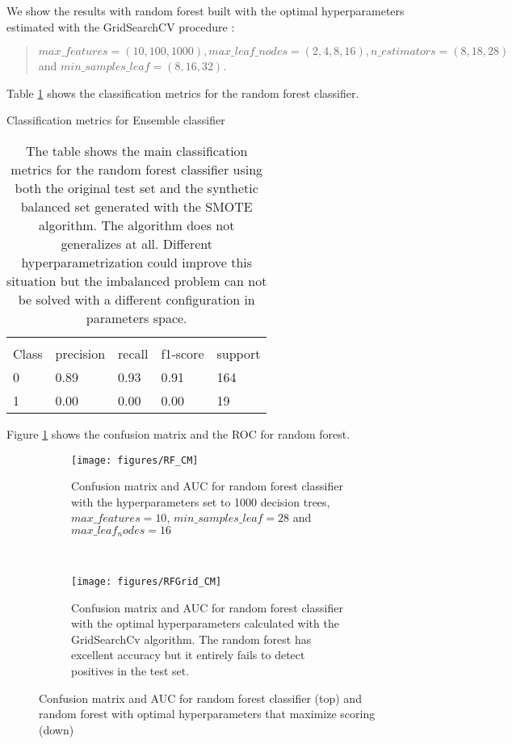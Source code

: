 \documentclass[11pt]{article}
\theoremstyle{definition}
\theoremstyle{remark}
\begin{document}
We show the results with random forest built with the optimal hyperparameters estimated with the GridSearchCV procedure
: 
\begin{quote}
$max\_features=(10,100,1000), max\_leaf\_nodes=(2,4,8,16), n\_estimators=(8,18,28)$ and  $min\_samples\_leaf=(8,16,32)$.
\end{quote}

Table \ref{tab:rf} shows the classification metrics for the random forest classifier.
\begin{table}[H]
\caption{Classification metrics for Ensemble classifier}
\begin{center} 
\begin{tabular}{lllll}
\hline
\multicolumn{1}{c}{} \\
Class & precision & recall & f1-score & support     \\
\hline
0 & 0.89  &    0.93   &   0.91   &    164 \\
1 & 0.00  &    0.00   &   0.00   &    19\\
\hline
\end{tabular}
\caption{The table shows the main classification metrics for the random forest classifier using both the original test set and the synthetic balanced set generated with the SMOTE algorithm. The algorithm does not generalizes at all. Different hyperparametrization could improve this situation but the imbalanced problem can not be solved with a different configuration in parameters space. }  \label{tab:rf} 
\end{center}
\end{table}


Figure \ref{fig:rf_cm} shows the confusion matrix and the ROC for random forest. 
\begin{figure}[H]
    \centering
    \begin{subfigure}[t]{.8\textwidth}
        \centering
        \texttt{[image: figures/RF\_CM]}
        \caption{Confusion matrix and AUC for random forest classifier with the hyperparameters set to 1000 decision trees, $max\_features= 10$, $min\_samples\_leaf=28$ and $max\_leaf_nodes=16$}
    \end{subfigure}
    ~ 
    \begin{subfigure}[t]{.8\textwidth}
        \centering
        \texttt{[image: figures/RFGrid\_CM]}
        \caption{Confusion matrix and AUC for random forest classifier with the optimal hyperparameters calculated with the GridSearchCv algorithm. The random forest has excellent accuracy but it entirely fails to detect positives in the test set.}
    \end{subfigure}%
    
    \caption{Confusion matrix and AUC for random forest classifier (top) and random forest with optimal hyperparameters that maximize scoring (down)} \label{fig:rf_cm}
\end{figure}
\end{document}

